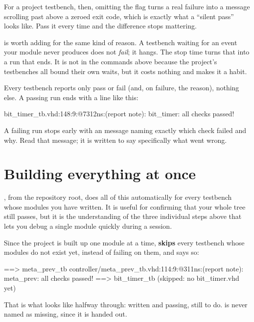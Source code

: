 For a project testbench, then, omitting the flag turns a real failure into a message scrolling past
above a zeroed exit code, which is exactly what a ``silent pass'' looks like. Pass it every time and
the difference stops mattering.

 is worth adding for the same kind of reason. A testbench waiting for an event
your module never produces does not \emph{fail}; it hangs. The stop time turns that into a run that
ends. It is not in the commands above because the project's testbenches all bound their own waits, but
it costs nothing and  makes it a habit.

Every testbench reports only pass or fail (and, on failure, the reason), nothing else. A passing run
ends with a line like this:

\begin{console}
bit_timer_tb.vhd:148:9:@7312ns:(report note): bit_timer: all checks passed!
\end{console}

A failing run stops early with an  message naming exactly which check failed
and why. Read that message; it is written to say specifically what went wrong.

\section{Building everything at once}
\label{app:sim:make}

, from the repository root, does all of this automatically for every
testbench whose modules you have written. It is useful for confirming that your whole tree still
passes, but it is the understanding of the three individual steps above that lets you debug a single
module quickly during a session.

Since the project is built up one module at a time,  \textbf{skips} every
testbench whose modules do not exist yet, instead of failing on them, and says so:

\begin{console}
==> meta_prev_tb
controller/meta_prev_tb.vhd:114:9:@311ns:(report note): meta_prev: all checks passed!
==> bit_timer_tb (skipped: no bit_timer.vhd yet)
\end{console}

That is what  looks like halfway through:  written and passing,
 still to do.  is never named as missing, since it is handed
out.

